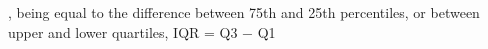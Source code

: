 , being equal to the difference between 75th and 25th percentiles, or between upper and lower quartiles, IQR = Q3 −  Q1